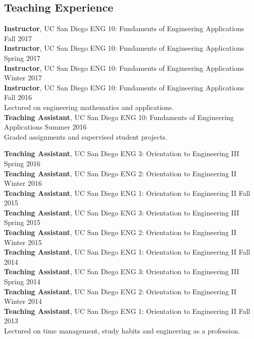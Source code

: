 \documentclass[]{res}
\begin{document}
\begin{resume}
\section{Teaching Experience}
\vspace{0.1in}

\textbf{Instructor}, UC San Diego ENG 10: Fundaments of Engineering Applications \hfill Fall 2017 \\
\textbf{Instructor}, UC San Diego ENG 10: Fundaments of Engineering Applications \hfill Spring 2017 \\
\textbf{Instructor}, UC San Diego ENG 10: Fundaments of Engineering Applications \hfill Winter 2017 \\
\textbf{Instructor}, UC San Diego ENG 10: Fundaments of Engineering Applications \hfill Fall 2016 \\
Lectured on engineering mathematics and applications. \\

\textbf{Teaching Assistant}, UC San Diego ENG 10: Fundaments of Engineering Applications \hfill Summer 2016 \\
Graded assignments and supervised student projects.

\textbf{Teaching Assistant}, UC San Diego ENG 3: Orientation to Engineering III \hfill Spring 2016 \\
\textbf{Teaching Assistant}, UC San Diego ENG 2: Orientation to Engineering II \hfill Winter 2016 \\
\textbf{Teaching Assistant}, UC San Diego ENG 1: Orientation to Engineering II \hfill Fall 2015 \\
\textbf{Teaching Assistant}, UC San Diego ENG 3: Orientation to Engineering III \hfill Spring 2015 \\
\textbf{Teaching Assistant}, UC San Diego ENG 2: Orientation to Engineering II \hfill Winter 2015 \\
\textbf{Teaching Assistant}, UC San Diego ENG 1: Orientation to Engineering II \hfill Fall 2014 \\
\textbf{Teaching Assistant}, UC San Diego ENG 3: Orientation to Engineering III \hfill Spring 2014 \\
\textbf{Teaching Assistant}, UC San Diego ENG 2: Orientation to Engineering II \hfill Winter 2014 \\
\textbf{Teaching Assistant}, UC San Diego ENG 1: Orientation to Engineering II \hfill Fall 2013 \\
Lectured on time management, study habits and engineering as a profession.




\end{resume}
\end{document}
